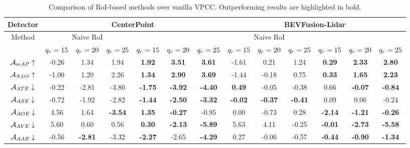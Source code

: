 
\begin{table*}[t]
    \centering
    \renewcommand{\arraystretch}{\TABVSPACE} %
    \setlength{\tabcolsep}{3pt} %
    \caption{Comparison of RoI-based methods over vanilla VPCC. Outperforming results are highlighted in bold.}
    \begin{tabular}{c|c|c|c|c|c|c|c|c|c|c|c|c}
    \hline
     Detector      & \multicolumn{6}{c|}{CenterPoint} & \multicolumn{6}{c}{BEVFusion-Lidar} \\
     
    \hline
    \multirow{2}{*}{Method}  & \multicolumn{3}{c|}{Naive RoI} & \multicolumn{3}{c|}{\methodname{}} &  \multicolumn{3}{c|}{Naive RoI} & \multicolumn{3}{c}{\methodname{}} \\ 
                               \cline{2-6}         \cline{5-7}            \cline{8-10}          \cline{11-13}
                &${q_{r}}=15$&${q_{r}}=20$&${q_{r}}=25$ &${q_{r}}=15$&${q_{r}}=20$&${q_{r}}=25$ &${q_{r}}=15$&${q_{r}}=20$&${q_{r}}=25$ &${q_{r}}=15$&${q_{r}}=20$&${q_{r}}=25$\\
    \hline
        $\mathcal{A}_{mAP}\uparrow$ & -0.26 & 1.34 & 1.94 & \textbf{1.92} & \textbf{3.51} & \textbf{3.61} & -1.61 & 0.21 & 1.24 & \textbf{0.29} & \textbf{2.33} & \textbf{2.80} \\ 
        $\mathcal{A}_{NDS}\uparrow$ & -1.00 & 1.20 & 2.26 & \textbf{1.34} & \textbf{2.90} & \textbf{3.69} & -1.44 & -0.18 & 0.75 & \textbf{0.33} & \textbf{1.65} & \textbf{2.23} \\ 
        $\mathcal{A}_{ATE}\downarrow$ & -0.22 & -2.81 & -3.80 & \textbf{-1.75} & \textbf{-3.92} & \textbf{-4.40} & \textbf{0.49} & -0.05 & -0.38 & 0.66 & \textbf{-0.07} & \textbf{-0.84} \\ 
        $\mathcal{A}_{ASE}\downarrow$ & -0.72 & -1.92 & -2.82 & \textbf{-1.44} & \textbf{-2.50} & \textbf{-3.32} & \textbf{-0.02} & \textbf{-0.37} & \textbf{-0.41} & 0.09 & 0.06 & -0.24 \\ 
        $\mathcal{A}_{AOE}\downarrow$ & 4.56 & 1.64 & \textbf{-3.54} & \textbf{1.35} & \textbf{-0.27} & -0.95 & 0.00 & -0.73 & 0.28 & \textbf{-2.14} & \textbf{-1.21} & \textbf{-0.26} \\ 
        $\mathcal{A}_{AVE}\downarrow$ & 5.60 & 0.60 & 0.56 & \textbf{0.30} & \textbf{-2.13} & \textbf{-5.89} & 5.63 & 4.11 & -0.25 & \textbf{-0.01} & \textbf{-2.73} & \textbf{-5.58} \\ 
        $\mathcal{A}_{AAE}\downarrow$ & -0.56 & \textbf{-2.81} & -3.32 & \textbf{-2.27} & -2.65 & \textbf{-4.29} & 0.27 & -0.06 & -0.57 & \textbf{-0.44} & \textbf{-0.90} & \textbf{-1.34} \\ 
    \hline
    \end{tabular}
    \label{tab-main-results}
    \vspace{-0.2cm}
\end{table*}



